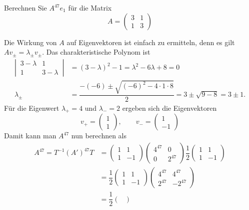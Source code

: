 Berechnen Sie $A^{47}e_1$ für die Matrix
\[
A=\begin{pmatrix}
3&1\\
1&3
\end{pmatrix}
\]


\begin{loesung}
Die Wirkung von $A$ auf Eigenvektoren ist einfach zu ermitteln,
denn es gilt $Av_{\pm}=\lambda_{\pm}v_{\pm}$.
Das charakteristische Polynom ist
\begin{align*}
\left|\,\begin{matrix}3-\lambda&1\\1&3-\lambda\end{matrix}\,\right|
&=
(3-\lambda)^2-1=\lambda^2-6\lambda+8=0
\\
\lambda_{\pm}&=\dfrac{-(-6)\pm\sqrt{(-6)^2-4\cdot 1 \cdot 8}}{2} = 3\pm\sqrt{9-8}=3\pm1.
\end{align*}
Für die Eigenwert $\lambda_+=4$ und $\lambda_-=2$ ergeben sich die
Eigenvektoren
\[
v_+=\begin{pmatrix}1\\1\end{pmatrix},\qquad
v_-=\begin{pmatrix}1\\-1\end{pmatrix}
\]
Damit kann man $A^{47}$ nun berechnen als
\begin{align*}
A^{47} = T^{-1}(A')^{47} T &= 
\begin{pmatrix}
 1 & 1\\
 1 & -1
\end{pmatrix}
\begin{pmatrix}
4^{47} & 0 \\
0 & 2^{47}
\end{pmatrix}
\dfrac{1}{2}
\begin{pmatrix}
1 & 1 \\
1 & -1
\end{pmatrix}
\\
&= 
\dfrac{1}{2}
\begin{pmatrix}
 1 & 1\\
 1 & -1
\end{pmatrix}
\begin{pmatrix}
4^{47} & 4^{47} \\
2^{47} & -2^{47}
\end{pmatrix}\\
&= 
\dfrac{1}{2}
\begin{pmatrix}

\end{pmatrix}
\end{align*}
\end{loesung}
